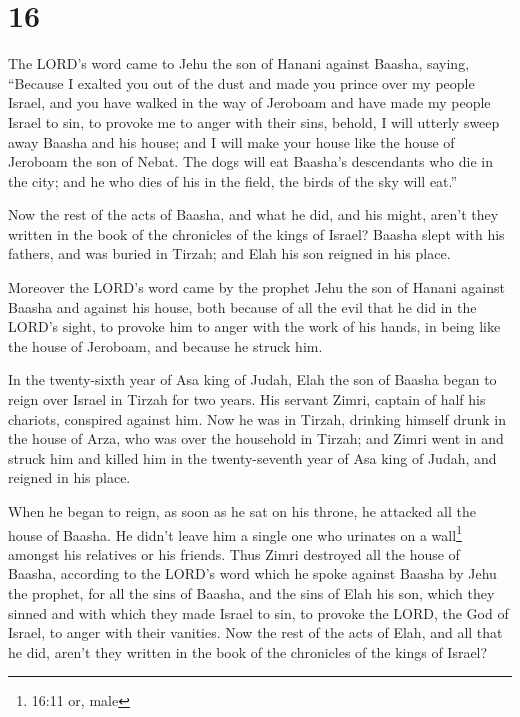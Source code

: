 \hypertarget{section-15}{%
\section{16}\label{section-15}}

 The LORD's word came to Jehu the son of Hanani against
Baasha, saying,  ``Because I exalted you out of the dust and
made you prince over my people Israel, and you have walked in the way of
Jeroboam and have made my people Israel to sin, to provoke me to anger
with their sins,  behold, I will utterly sweep away Baasha
and his house; and I will make your house like the house of Jeroboam the
son of Nebat.  The dogs will eat Baasha's descendants who
die in the city; and he who dies of his in the field, the birds of the
sky will eat.''

 Now the rest of the acts of Baasha, and what he did, and
his might, aren't they written in the book of the chronicles of the
kings of Israel?  Baasha slept with his fathers, and was
buried in Tirzah; and Elah his son reigned in his place.

 Moreover the LORD's word came by the prophet Jehu the son
of Hanani against Baasha and against his house, both because of all the
evil that he did in the LORD's sight, to provoke him to anger with the
work of his hands, in being like the house of Jeroboam, and because he
struck him.

 In the twenty-sixth year of Asa king of Judah, Elah the son
of Baasha began to reign over Israel in Tirzah for two years.
 His servant Zimri, captain of half his chariots, conspired
against him. Now he was in Tirzah, drinking himself drunk in the house
of Arza, who was over the household in Tirzah;  and Zimri
went in and struck him and killed him in the twenty-seventh year of Asa
king of Judah, and reigned in his place.

 When he began to reign, as soon as he sat on his throne,
he attacked all the house of Baasha. He didn't leave him a single one
who urinates on a wall\footnote{16:11 or, male} amongst his relatives or
his friends.  Thus Zimri destroyed all the house of Baasha,
according to the LORD's word which he spoke against Baasha by Jehu the
prophet,  for all the sins of Baasha, and the sins of Elah
his son, which they sinned and with which they made Israel to sin, to
provoke the LORD, the God of Israel, to anger with their vanities.
 Now the rest of the acts of Elah, and all that he did,
aren't they written in the book of the chronicles of the kings of
Israel?

